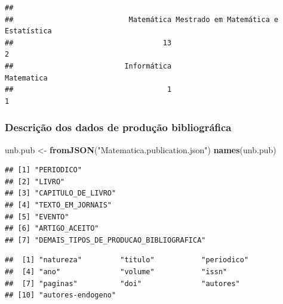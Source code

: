 \documentclass[]{article}
\newenvironment{Shaded}{\begin{snugshade}}{\end{snugshade}}
\newcommand{\KeywordTok}[1]{\textcolor[rgb]{0.13,0.29,0.53}{\textbf{#1}}}
\newcommand{\DataTypeTok}[1]{\textcolor[rgb]{0.13,0.29,0.53}{#1}}
\newcommand{\DecValTok}[1]{\textcolor[rgb]{0.00,0.00,0.81}{#1}}
\newcommand{\StringTok}[1]{\textcolor[rgb]{0.31,0.60,0.02}{#1}}
\newcommand{\OtherTok}[1]{\textcolor[rgb]{0.56,0.35,0.01}{#1}}
\newcommand{\OperatorTok}[1]{\textcolor[rgb]{0.81,0.36,0.00}{\textbf{#1}}}
\newcommand{\NormalTok}[1]{#1}
\begin{document}
\begin{verbatim}
## 
##                           Matemática Mestrado em Matemática e Estatística 
##                                   13                                    2 
##                          Informática                           Matematica 
##                                    1                                    1
\end{verbatim}

\subsubsection{Descrição dos dados de produção
bibliográfica}\label{descricao-dos-dados-de-producao-bibliografica}

\begin{Shaded}
\begin{Highlighting}[]
\NormalTok{unb.pub <-}\StringTok{ }\KeywordTok{fromJSON}\NormalTok{(}\StringTok{"Matematica.publication.json"}\NormalTok{)}
\KeywordTok{names}\NormalTok{(unb.pub)}
\end{Highlighting}
\end{Shaded}

\begin{verbatim}
## [1] "PERIODICO"                             
## [2] "LIVRO"                                 
## [3] "CAPITULO_DE_LIVRO"                     
## [4] "TEXTO_EM_JORNAIS"                      
## [5] "EVENTO"                                
## [6] "ARTIGO_ACEITO"                         
## [7] "DEMAIS_TIPOS_DE_PRODUCAO_BIBLIOGRAFICA"
\end{verbatim}

\begin{Shaded}
\end{Shaded}

\begin{verbatim}
##  [1] "natureza"         "titulo"           "periodico"       
##  [4] "ano"              "volume"           "issn"            
##  [7] "paginas"          "doi"              "autores"         
## [10] "autores-endogeno"
\end{verbatim}

\begin{Shaded}
\end{Shaded}
\end{document}
